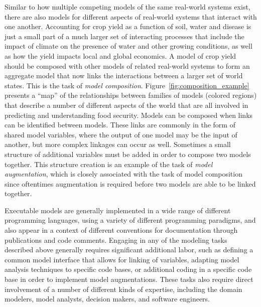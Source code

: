Similar to how multiple competing models of the same real-world systems exist, there are also models for different aspects of real-world systems that interact with one another.
Accounting for crop yield as a function of soil, water and disease is just a small part of a much larger set of interacting processes that include the impact of climate on the presence of water and other growing conditions, as well as how the yield impacts local and global economics. A model of crop yield should be composed with other models of related real-world systems to form an aggregate model that now links the interactions between a larger set of world states.
This is the task of \textit{model composition}. 
Figure~\ref{fig:composition_example} presents a ``map'' of the relationships between families of models (colored regions) that describe a number of different aspects of the world that are all involved in predicting and understanding food security.
Models can be composed when links can be identified between models.
These links are commonly in the form of shared model variables, where the output of one model may be the input of another, but more complex linkages can occur as well.
Sometimes a small structure of additional variables must be added in order to compose two models together.
This structure creation is an example of the task of \textit{model augmentation}, which is closely associated with the task of model composition since oftentimes augmentation is required before two models are able to be linked together.

Executable models are generally implemented in a wide range of different programming languages, using a variety of different programming paradigms, and also appear in a context of different conventions for documentation through publications and code comments. Engaging in any of the modeling tasks described above generally requires significant additional labor, such as defining a common model interface that allows for linking of variables, adapting model analysis techniques to specific code bases, or additional coding in a specific code base in order to implement model augmentations. These tasks also require direct involvement of a number of different kinds of expertise, including the domain modelers, model analysts, decision makers, and software engineers.


